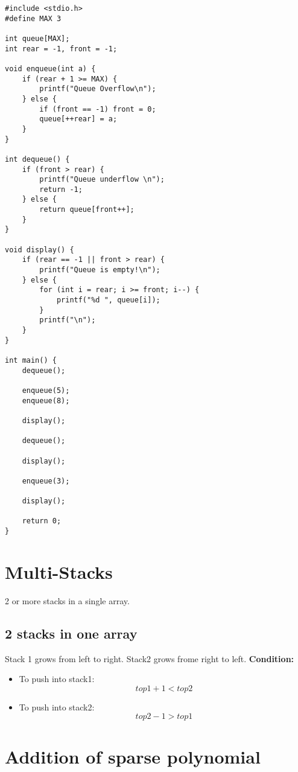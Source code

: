 \documentclass{article}
\begin{document}
\begin{lstlisting}[caption={Implementation of Queue}]
#include <stdio.h>
#define MAX 3

int queue[MAX];
int rear = -1, front = -1;

void enqueue(int a) {
    if (rear + 1 >= MAX) {
        printf("Queue Overflow\n");
    } else {
        if (front == -1) front = 0;
        queue[++rear] = a;
    }
}

int dequeue() {
    if (front > rear) {
        printf("Queue underflow \n");
        return -1;
    } else {
        return queue[front++];
    }
}

void display() {
    if (rear == -1 || front > rear) {
        printf("Queue is empty!\n");
    } else {
        for (int i = rear; i >= front; i--) {
            printf("%d ", queue[i]);
        }
        printf("\n");
    }
}

int main() {
    dequeue();

    enqueue(5);
    enqueue(8);

    display();

    dequeue();

    display();

    enqueue(3);

    display();

    return 0;
}

\end{lstlisting}

\section{Multi-Stacks}
2 or more stacks in a single array.

\subsection{2 stacks in one array}

Stack 1 grows from left to right.
Stack2 grows frome right to left. \textbf{Condition:}

\begin{itemize}
    \item To push into stack1: \[top1 + 1 < top2\]
    \item To push into stack2: \[top2 - 1 > top1\]
\end{itemize}

\section{Addition of sparse polynomial}
\end{document}
